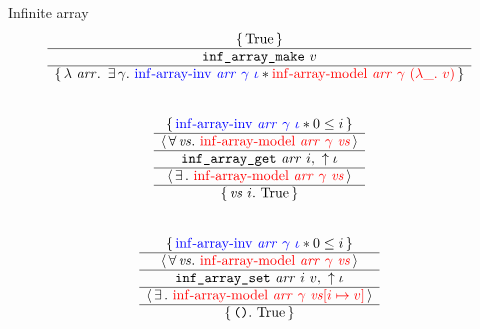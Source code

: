\begin{frame}{Infinite array}
\small
\[
	\begin{array}{c}
			\triplePretty{
				\iTrue
			}{
				\texttt{inf\_array\_make}\ v
			}{
				\lambda\ \mathit{arr} .\ 
				\exists \gamma .\
				\textcolor{blue}{\mathrm{inf \mathhyphen array \mathhyphen inv}\ \mathit{arr}\ \gamma\ \iota} \iSep
				\textcolor{red}{\mathrm{inf \mathhyphen array \mathhyphen model}\ \mathit{arr}\ \gamma\ (\lambda \_ .\ v)}
			}
		\\\\\\
			\atripleExtPretty{
				\textcolor{blue}{\mathrm{inf \mathhyphen array \mathhyphen inv}\ \mathit{arr}\ \gamma\ \iota} \iSep
				0 \leq i
			}{
				\mathit{vs}
			}{
				\textcolor{red}{\mathrm{inf \mathhyphen array \mathhyphen model}\ \mathit{arr}\ \gamma\ \mathit{vs}}
			}{
				\texttt{inf\_array\_get}\ \mathit{arr}\ i
			}{
				\uparrow\iota
			}{
			}{
				\textcolor{red}{\mathrm{inf \mathhyphen array \mathhyphen model}\ \mathit{arr}\ \gamma\ \mathit{vs}}
			}{
				\mathit{vs}\ i
			}{
				\iTrue
			}
		\\\\\\
			\atripleExtPretty{
				\textcolor{blue}{\mathrm{inf \mathhyphen array \mathhyphen inv}\ \mathit{arr}\ \gamma\ \iota} \iSep
				0 \leq i
			}{
				\mathit{vs}
			}{
				\textcolor{red}{\mathrm{inf \mathhyphen array \mathhyphen model}\ \mathit{arr}\ \gamma\ \mathit{vs}}
			}{
				\texttt{inf\_array\_set}\ \mathit{arr}\ i\ v
			}{
				\uparrow\iota
			}{
			}{
				\textcolor{red}{\mathrm{inf \mathhyphen array \mathhyphen model}\ \mathit{arr}\ \gamma\ \mathit{vs} [i \mapsto v]}
			}{
				\exprUnit
			}{
				\iTrue
			}
	\end{array}
\]
\end{frame}
